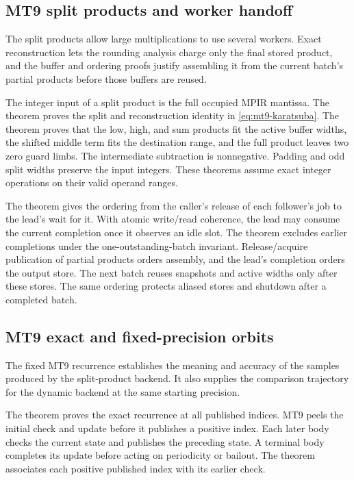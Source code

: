 \subsection{MT9 split products and worker handoff}
\label{subsec:reference-orbit-proof-mt9-exact}

The split products allow large multiplications to use several workers.
Exact reconstruction lets the rounding analysis charge only the final
stored product, and the buffer and ordering proofs justify assembling it
from the current batch's partial products before those buffers are reused.

The integer input of a split product is the full occupied MPIR mantissa.
The theorem  proves the split and reconstruction
identity in \eqref{eq:mt9-karatsuba}. The theorem 
proves that the low, high, and sum products fit the active buffer widths,
the shifted middle term fits the destination range, and the full product
leaves two zero guard limbs. The intermediate subtraction is nonnegative.
Padding and odd split widths preserve the input integers. These theorems
assume exact integer operations on their valid operand ranges.

The theorem  gives the ordering from
the caller's release of each follower's job to the lead's wait for it.
With atomic write/read coherence, the lead may consume the current
completion once it observes an idle slot. The theorem
 excludes earlier completions under the
one-outstanding-batch invariant. Release/acquire publication of partial
products orders assembly, and the lead's completion orders the output
store. The next batch reuses snapshots and active widths only after
these stores. The same ordering protects aliased stores and shutdown
after a completed batch.

\subsection{MT9 exact and fixed-precision orbits}
\label{subsec:reference-orbit-proof-mt9-precision}

The fixed MT9 recurrence establishes the meaning and accuracy of the
samples produced by the split-product backend. It also supplies the
comparison trajectory for the dynamic backend at the same starting
precision.

The theorem  proves the exact recurrence at
all published indices. MT9 peels the initial check and update before
it publishes a positive index. Each later body checks the current
state and publishes the preceding state. A terminal body completes
its update before acting on periodicity or bailout. The theorem
 associates each positive
published index with its earlier check.

